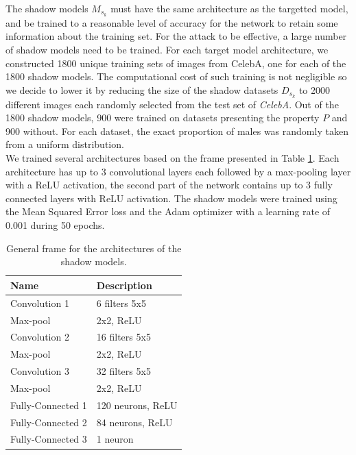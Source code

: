 \documentclass[11pt]{article}
\begin{document}
The shadow models $M_{s_k}$ must have the same architecture as the targetted model, and be trained to a reasonable level of accuracy for the network to retain some information about the training set. For the attack to be effective, a large number of shadow models need to be trained. For each target model architecture, we constructed 1800 unique training sets of images from CelebA, one for each of the 1800 shadow models. The computational cost of such training is not negligible so we decide to lower it by reducing the size of the shadow datasets $D_{s_k}$ to 2000 different images each randomly selected from the test set of \textit{CelebA}. Out of the 1800 shadow models, 900  were trained on datasets presenting the property $P$ and 900 without. For each dataset, the exact proportion of males was randomly taken from a uniform distribution.\\

We trained several architectures based on the frame presented in Table \ref{shadow_architecture}. Each architecture has up to 3 convolutional layers each followed by a max-pooling layer with a ReLU activation, the second part of the network contains up to 3 fully connected layers with ReLU activation. The shadow models were trained using the Mean Squared Error loss and the Adam optimizer with a learning rate of 0.001 during 50 epochs.

\begin{table}[h]
\centering
\begin{tabular}{@{}ll@{}}
\toprule
Name              & Description       \\ \midrule
Convolution 1     & 6 filters 5x5     \\
Max-pool          & 2x2, ReLU         \\
Convolution 2     & 16 filters 5x5    \\
Max-pool          & 2x2, ReLU         \\
Convolution 3     & 32 filters 5x5    \\
Max-pool          & 2x2, ReLU         \\
Fully-Connected 1 & 120 neurons, ReLU \\
Fully-Connected 2 & 84 neurons, ReLU  \\
Fully-Connected 3 & 1 neuron          \\ \bottomrule
\end{tabular}
\caption{General frame for the architectures of the shadow models. }
\label{shadow_architecture}
\end{table}
\end{document}
